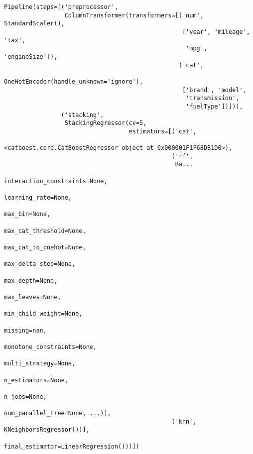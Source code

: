 \documentclass[
  letterpaper,
  DIV=11,
  numbers=noendperiod]{scrreprt}
\begin{document}
\begin{verbatim}
Pipeline(steps=[('preprocessor',
                 ColumnTransformer(transformers=[('num', StandardScaler(),
                                                  ['year', 'mileage', 'tax',
                                                   'mpg', 'engineSize']),
                                                 ('cat',
                                                  OneHotEncoder(handle_unknown='ignore'),
                                                  ['brand', 'model',
                                                   'transmission',
                                                   'fuelType'])])),
                ('stacking',
                 StackingRegressor(cv=5,
                                   estimators=[('cat',
                                                <catboost.core.CatBoostRegressor object at 0x000001F1F68DB1D0>),
                                               ('rf',
                                                Ra...
                                                             interaction_constraints=None,
                                                             learning_rate=None,
                                                             max_bin=None,
                                                             max_cat_threshold=None,
                                                             max_cat_to_onehot=None,
                                                             max_delta_step=None,
                                                             max_depth=None,
                                                             max_leaves=None,
                                                             min_child_weight=None,
                                                             missing=nan,
                                                             monotone_constraints=None,
                                                             multi_strategy=None,
                                                             n_estimators=None,
                                                             n_jobs=None,
                                                             num_parallel_tree=None, ...)),
                                               ('knn', KNeighborsRegressor())],
                                   final_estimator=LinearRegression()))])
\end{verbatim}
\end{document}
